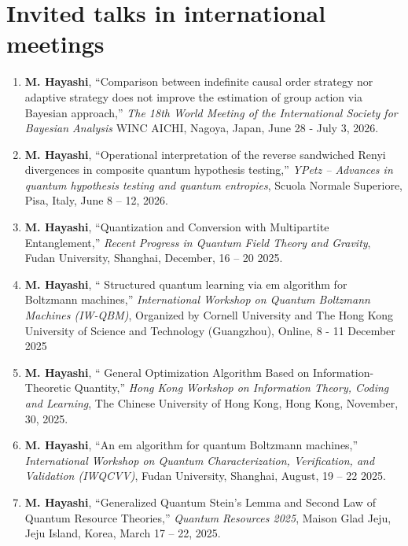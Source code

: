 \documentclass[a4paper,12pt,oneside]{article}
\begin{document}
\section{Invited talks in international meetings}
\begin{enumerate}

\item
\textbf{M. Hayashi}, 
``Comparison between indefinite causal order strategy nor adaptive strategy does not improve the estimation of group action via Bayesian approach,''
{\em The 18th World Meeting of the International Society for Bayesian Analysis}
WINC AICHI, Nagoya, Japan, June 28 - July 3, 2026.

\item
\textbf{M. Hayashi}, 
``Operational interpretation of the reverse sandwiched Renyi
divergences in composite quantum hypothesis testing,''
{\em  YPetz – Advances in quantum hypothesis testing and quantum entropies}, 
Scuola Normale Superiore, Pisa, Italy,
June 8 -- 12, 2026.

\item
\textbf{M. Hayashi}, 
``Quantization and Conversion with Multipartite Entanglement,'' 
{\em Recent Progress in Quantum Field Theory and Gravity}, 
Fudan University,
Shanghai, 
December, 16 -- 20 2025.


\item
\textbf{M. Hayashi}, 
`` Structured quantum learning via em algorithm for Boltzmann machines,'' 
{\em International Workshop on Quantum Boltzmann Machines (IW-QBM)}, 
Organized by Cornell University and 
The Hong Kong University of Science and Technology (Guangzhou),
Online, 8 - 11 December 2025

\item
\textbf{M. Hayashi}, 
`` General Optimization Algorithm Based on Information-Theoretic Quantity,'' 
{\em Hong Kong Workshop on Information Theory, Coding and Learning}, 
The Chinese University of Hong Kong, Hong Kong, 
November, 30, 2025.

\item
\textbf{M. Hayashi}, 
``An em algorithm for quantum 
Boltzmann machines,'' 
{\em International Workshop on Quantum Characterization, Verification, and Validation (IWQCVV)}, 
Fudan University,
Shanghai, 
August, 19 -- 22 2025.

\item
\textbf{M. Hayashi}, 
``Generalized Quantum Stein's Lemma and Second Law of Quantum Resource Theories,'' 
{\em Quantum Resources 2025},
Maison Glad Jeju,
Jeju Island, Korea, March 17 -- 22, 2025.


\end{enumerate}
\end{document}
